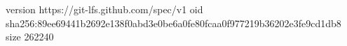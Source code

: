 version https://git-lfs.github.com/spec/v1
oid sha256:89ee69441b2692e138f0abd3e0be6a0fe80fcaa0f977219b36202e3fe9cd1db8
size 262240
